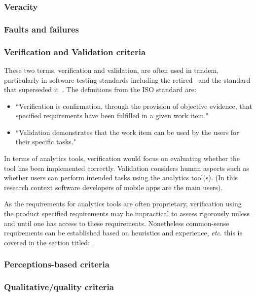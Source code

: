 \subsubsection{Veracity}

\subsubsection{Faults and failures}


\subsubsection{Verification and Validation criteria}
These two terms, verification and validation, are often used in tandem, particularly in software testing standards including the retired~\cite{BS_7925_1_1998} and the standard that superseded it~\cite{iso29119-1-2013}. The definitions from the ISO standard are:
\begin{itemize}
    \item ``Verification is confirmation, through the provision of objective evidence, that specified requirements have been fulfilled in a given work item."~\cite{iso29119-1-2013}
    \item ``Validation demonstrates that the work item can be used by the users for their specific tasks."~\cite{iso29119-1-2013}
\end{itemize}

In terms of analytics tools, verification would focus on evaluating whether the tool has been implemented correctly. Validation considers human aspects such as whether users can perform intended tasks using the analytics tool(s). (In this research context software developers of mobile apps are the main users).

As the requirements for analytics tools are often proprietary, verification using the product specified requirements may be impractical to assess rigorously unless and until one has access to these requirements. Nonetheless common-sense requirements can be established based on heuristics and experience, \emph{etc}. this is covered in the section titled: \href{rubric-for-evaluating-analytics-tools}{}.

\subsubsection{Perceptions-based criteria}

\subsubsection{Qualitative/quality criteria}

